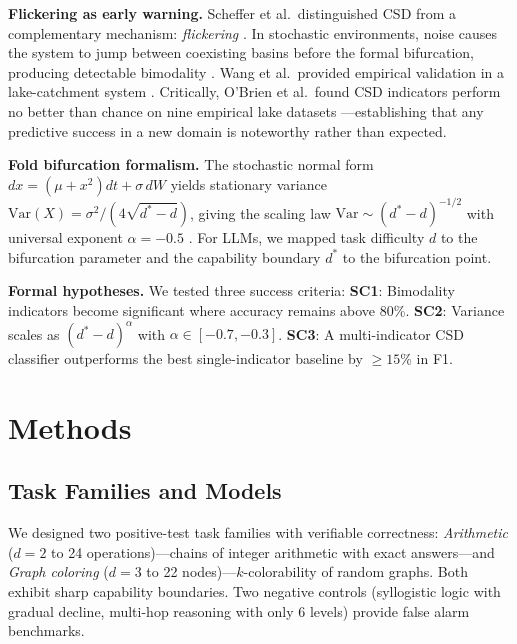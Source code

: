 \documentclass[11pt,letterpaper]{article}
\begin{document}
\textbf{Flickering as early warning.} Scheffer et al.\ distinguished CSD from a complementary mechanism: \emph{flickering} \cite{scheffer2012}. In stochastic environments, noise causes the system to jump between coexisting basins before the formal bifurcation, producing detectable bimodality \cite{dakos2013}. Wang et al.\ provided empirical validation in a lake-catchment system \cite{wang2012flickering}. Critically, O'Brien et al.\ found CSD indicators perform no better than chance on nine empirical lake datasets \cite{obrien2023}---establishing that any predictive success in a new domain is noteworthy rather than expected.

\textbf{Fold bifurcation formalism.} The stochastic normal form $dx = (\mu + x^2)dt + \sigma\,dW$ yields stationary variance $\text{Var}(X) = \sigma^2/(4\sqrt{d^*{-}d})$, giving the scaling law $\text{Var} \sim (d^*{-}d)^{-1/2}$ with universal exponent $\alpha = -0.5$ \cite{kuehn2011}. For LLMs, we mapped task difficulty $d$ to the bifurcation parameter and the capability boundary $d^*$ to the bifurcation point.

\textbf{Formal hypotheses.} We tested three success criteria: \textbf{SC1}: Bimodality indicators become significant where accuracy remains above 80\%. \textbf{SC2}: Variance scales as $(d^* - d)^{\alpha}$ with $\alpha \in [-0.7, -0.3]$. \textbf{SC3}: A multi-indicator CSD classifier outperforms the best single-indicator baseline by ${\geq}15\%$ in F1.

\section{Methods}
\label{sec:methods}

\subsection{Task Families and Models}

We designed two positive-test task families with verifiable correctness: \emph{Arithmetic} ($d{=}2$ to 24 operations)---chains of integer arithmetic with exact answers---and \emph{Graph coloring} ($d{=}3$ to 22 nodes)---$k$-colorability of random graphs. Both exhibit sharp capability boundaries. Two negative controls (syllogistic logic with gradual decline, multi-hop reasoning with only 6 levels) provide false alarm benchmarks.
\end{document}
